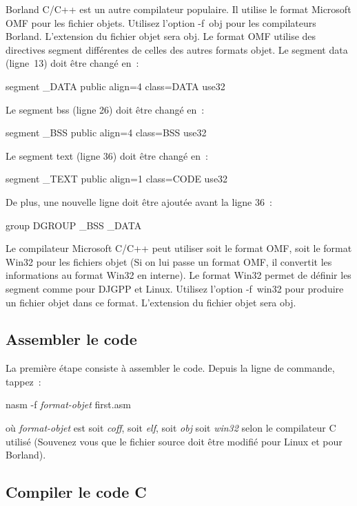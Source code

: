 {Borland C/C++  est un autre compilateur populaire. Il
utilise le format Microsoft OMF pour les fichier objets. Utilisez l'option
{\code -f~obj} pour les compilateurs Borland. L'extension du fichier objet
sera {\code obj}. Le format OMF utilise des directives {\code segment}
différentes de celles des autres formats objet. Le segment data
(ligne~13) doit être changé en~:
\begin{CodeQuote}
segment \_DATA public align=4 class=DATA use32
\end{CodeQuote}
Le segment bss (ligne 26) doit être changé en~:
\begin{CodeQuote}
segment \_BSS public align=4 class=BSS use32
\end{CodeQuote}
Le segment text (ligne 36) doit être changé en~:
\begin{CodeQuote}
segment \_TEXT public align=1 class=CODE use32
\end{CodeQuote}
De plus, une nouvelle ligne doit être ajoutée avant la ligne 36~:
\begin{CodeQuote}
group DGROUP \_BSS \_DATA
\end{CodeQuote}

Le compilateur Microsoft C/C++  peut utiliser
soit le format OMF, soit le format Win32 pour les fichiers objet
(Si on lui passe un format OMF, il convertit les informations au format
Win32 en interne). Le format Win32 permet de définir les segment comme
pour DJGPP et Linux. Utilisez l'option {\code -f~win32} pour produire
un fichier objet dans ce format. L'extension du fichier objet sera {\code obj}.

\subsection{Assembler le code}

La première étape consiste à assembler le code. Depuis la ligne de commande, tappez~:
\begin{CodeQuote}
nasm -f {\em format-objet} first.asm
\end{CodeQuote}
où {\em format-objet} est soit {\em coff\/}, soit {\em elf\/}, soit {\em obj} soit
{\em win32} selon le compilateur C utilisé (Souvenez vous que le fichier source
doit être modifié pour Linux et pour Borland).


\subsection{Compiler le code C}

}
